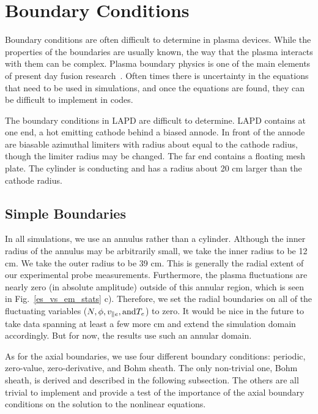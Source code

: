 \section{Boundary Conditions}
\label{s_bcs}

Boundary conditions are often difficult to determine in plasma devices. While the properties of the boundaries are usually known, the way that the plasma interacts with them can be complex.
Plasma boundary physics is one of the main elements of present day fusion research~\cite{stangeby2000}. Often times there is uncertainty in the equations that need to be used in simulations,
and once the equations are found, they can be difficult to implement in codes.

The boundary conditions in LAPD are difficult to determine. LAPD contains at one end, a hot emitting cathode behind a biased annode. In front of the annode are biasable azimuthal limiters
with radius about equal to the cathode radius, though the limiter radius may be changed. The far end contains a floating mesh plate. The cylinder is conducting and has a radius about 20 cm larger
than the cathode radius.

\subsection{Simple Boundaries}
\label{ss_s_bc}

In all simulations, we use an annulus rather than a cylinder. Although the inner radius of the annulus may be arbitrarily small, we take the inner radius to be 12 cm. We take the outer radius
to be 39 cm. This is generally the radial extent of our experimental probe measurements. Furthermore, the plasma fluctuations are nearly zero (in absolute amplitude) outside of this annular
region, which is seen in Fig.~\ref{es_vs_em_stats} c). Therefore, we set the radial boundaries on all of the fluctuating variables ($N, \phi, v_{\parallel e}, {\rm and } T_e$) to zero. It would be nice
in the future to take data spanning at least a few more cm and extend the simulation domain accordingly. But for now, the results use such an annular domain.

As for the axial boundaries, we use four different boundary conditions: periodic, zero-value, zero-derivative, and Bohm sheath. The only non-trivial one, Bohm sheath, is derived and described in
the following subsection. The others are all trivial to implement and provide a test of the importance of the axial boundary conditions on the solution to the nonlinear equations.

